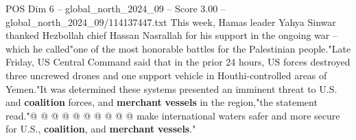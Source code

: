 \begin{textsample}{POS Dim 6 – global\_north\_2024\_09 – Score 3.00 – global\_north\_2024\_09/114137447.txt}
This week, Hamas leader Yahya Sinwar thanked Hezbollah chief Hassan Nasrallah for his support in the ongoing war -- which he called"one of the most honorable battles for the Palestinian people."Late Friday, US Central Command said that in the prior 24 hours, US forces destroyed three uncrewed drones and one support vehicle in Houthi-controlled areas of Yemen."It was determined these systems presented an imminent threat to U.S. and \textbf{coalition} forces, and \textbf{merchant} \textbf{vessels} in the region,"the statement read."@ @ @ @ @ @ @ @ @ @ make international waters safer and more secure for U.S., \textbf{coalition}, and \textbf{merchant} \textbf{vessels}."

\end{textsample}

